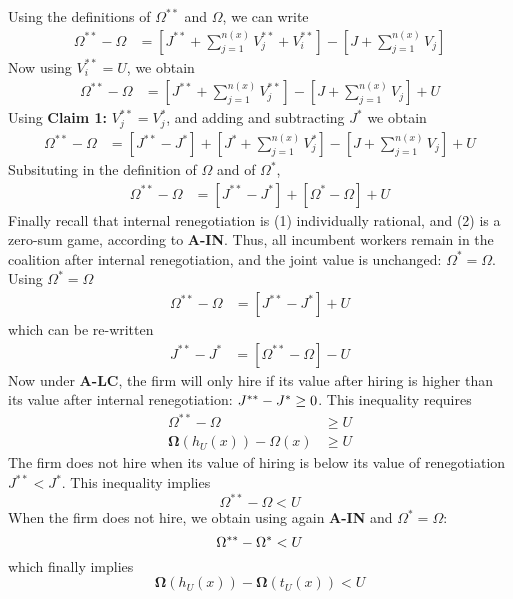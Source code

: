 Using the definitions of $\Omega^{**}$ and $\Omega$, we can write
\begin{align*}
\Omega^{\ast\ast}-\Omega & =\left[J^{\ast\ast}+\sum_{j=1}^{n(x)}V_{j}^{\ast%
\ast}+V_{i}^{\ast\ast}\right]-\left[J+\sum_{j=1}^{n\left(x\right)}V_{j}%
\right]
\end{align*}
Now using $V_i^{**} =U$, we obtain
\begin{align*}
\Omega^{\ast\ast}-\Omega & =\left[J^{\ast\ast}+\sum_{j=1}^{n(x)}V_{j}^{\ast%
\ast}\right]-\left[J+\sum_{j=1}^{n\left(x\right)}V_{j}\right]+U
\end{align*}
Using \textbf{Claim 1:} $V_{j}^{**} = V_j^*$, and adding and subtracting $J^\ast$ we obtain
\begin{align*}
\Omega^{\ast\ast}-\Omega & =\left[J^{\ast\ast}-J^{\ast}\right]
+\left[J^{\ast}+\sum_{j=1}^{n(x)}V_{j}^{\ast}\right]
-\left[J+\sum_{j=1}^{n\left(x\right)}V_{j}\right]+U
\end{align*}
Subsituting in the definition of $\Omega$ and of $\Omega^*$,
\begin{align*}
\Omega^{\ast\ast}-\Omega & =\left[J^{\ast\ast}-J^{\ast}\right]%
+\left[\Omega^*-\Omega\right] +U
\end{align*}
Finally recall that internal renegotiation is (1) individually rational, and (2) is a zero-sum game, according to \textbf{A-IN}. Thus, all incumbent workers remain in the coalition after internal renegotiation, and the joint value is unchanged: $\Omega^* = \Omega$. Using $\Omega^* = \Omega$
\begin{align*}
\Omega^{\ast\ast}-\Omega & =\left[J^{\ast\ast}-J^{\ast}\right]+U
\end{align*}
which can be re-written
\begin{align*}
J^{\ast\ast}-J^{\ast} & =\left[\Omega^{\ast\ast}-\Omega\right]-U
\end{align*}
Now under \textbf{A-LC}, the firm will only hire if its value after hiring
is higher than its value after internal renegotiation: $J^{\ast\ast}-J^{%
\ast}\geq0$. This inequality requires
\begin{align*}
\Omega^{\ast\ast}-\Omega & \geq U \\
\boldsymbol{\Omega}\left(h_{U}\left(x\right)\right)-\Omega\left(x\right) & \geq U
\end{align*}
The firm does not hire when its value of hiring is below its value of
renegotiation $J^{**} < J^*$. This inequality implies
\begin{equation*}
\Omega^{\ast\ast}-\Omega < U
\end{equation*}
When the firm does not hire, we obtain using again \textbf{A-IN} and $\Omega^* = \Omega$:
\begin{equation*}
\Omega^{\ast\ast}-\Omega^* < U \newline
\end{equation*}
which finally implies
\begin{equation*}
\boldsymbol{\Omega}\left(h_{U}\left(x\right)\right)-\boldsymbol{\Omega}%
\left(t_U(x)\right) < U
\end{equation*}

